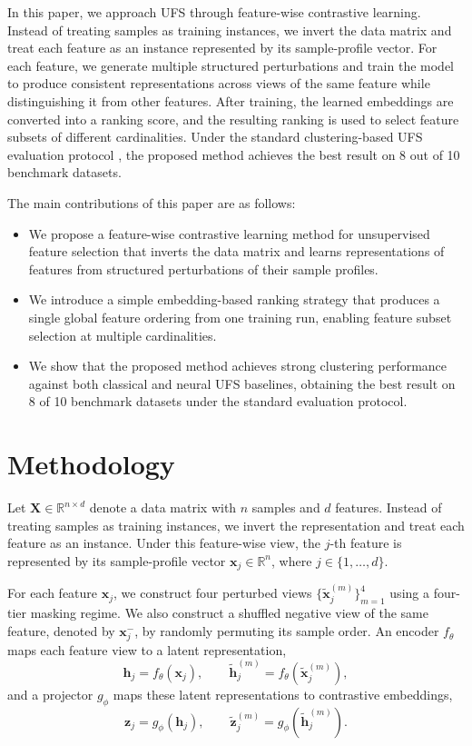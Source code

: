 \documentclass[sigconf,natbib=true,anonymous=true]{acmart}
\begin{document}
In this paper, we approach UFS through feature-wise contrastive learning.
Instead of treating samples as training instances, we invert the data matrix and
treat each feature as an instance represented by its sample-profile vector. For
each feature, we generate multiple structured perturbations and train the model
to produce consistent representations across views of the same feature while
distinguishing it from other features. After training, the learned embeddings
are converted into a ranking score, and the resulting ranking is used to select
feature subsets of different cardinalities. Under the standard clustering-based
UFS evaluation protocol \cite{shaham2022deep}, the proposed method achieves the best result on 8 out
of 10 benchmark datasets.

The main contributions of this paper are as follows:
\begin{itemize}
\item We propose a feature-wise contrastive learning method for unsupervised
feature selection that inverts the data matrix and learns representations of
features from structured perturbations of their sample profiles.
\item We introduce a simple embedding-based ranking strategy that produces a
single global feature ordering from one training run, enabling feature subset
selection at multiple cardinalities.
\item We show that the proposed method achieves strong clustering performance
against both classical and neural UFS baselines, obtaining the best result on 8
of 10 benchmark datasets under the standard evaluation protocol.
\end{itemize}

\section{Methodology}
Let $\mathbf{X} \in \mathbb{R}^{n \times d}$ denote a data matrix with $n$
samples and $d$ features. Instead of treating samples as training instances, we
invert the representation and treat each feature as an instance. Under this
feature-wise view, the $j$-th feature is represented by its sample-profile
vector $\mathbf{x}_j \in \mathbb{R}^{n}$, where $j \in \{1,\dots,d\}$.

For each feature $\mathbf{x}_j$, we construct four perturbed views
$\{\tilde{\mathbf{x}}_j^{(m)}\}_{m=1}^{4}$ using a four-tier masking regime. We
also construct a shuffled negative view of the same feature, denoted by
$\mathbf{x}_j^{-}$, by randomly permuting its sample order. An encoder $f_\theta$ maps
each feature view to a latent representation,
\[
\mathbf{h}_j = f_\theta(\mathbf{x}_j), \qquad
\tilde{\mathbf{h}}_j^{(m)} = f_\theta(\tilde{\mathbf{x}}_j^{(m)}),
\]
and a projector $g_\phi$ maps these latent representations to contrastive
embeddings,
\[
\mathbf{z}_j = g_\phi(\mathbf{h}_j), \qquad
\tilde{\mathbf{z}}_j^{(m)} = g_\phi(\tilde{\mathbf{h}}_j^{(m)}).
\]
\end{document}
